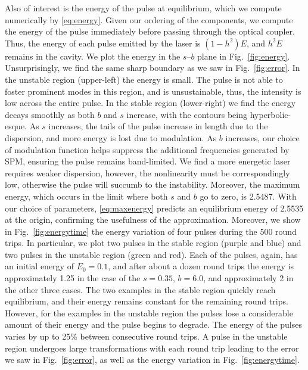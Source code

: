 \documentclass[9pt,twocolumn,twoside]{osajnl}
\begin{document}
Also of interest is the energy of the pulse at equilibrium, which we compute numerically by \eqref{eq:energy}. Given our ordering of the components, we compute the energy of the pulse immediately before passing through the optical coupler. Thus, the energy of each pulse emitted by the laser is $(1 - h^2) E$, and $h^2 E$ remains in the cavity. We plot the energy in the $s$--$b$ plane in Fig.~\ref{fig:energy}. Unsurprisingly, we find the same sharp boundary as we saw in Fig.~\ref{fig:error}. In the unstable region (upper-left) the energy is small. The pulse is not able to foster prominent modes in this region, and is unsustainable, thus, the intensity is low across the entire pulse. In the stable region (lower-right) we find the energy decays smoothly as both $b$ and $s$ increase, with the contours being hyperbolic-esque. As $s$ increases, the tails of the pulse increase in length due to the dispersion, and more energy is lost due to modulation. As $b$ increases, our choice of modulation function helps suppress the additional frequencies generated by SPM, ensuring the pulse remains band-limited. We find a more energetic laser requires weaker dispersion, however, the nonlinearity must be correspondingly low, otherwise the pulse will succumb to the instability. Moreover, the maximum energy, which occurs in the limit where both $s$ and $b$ go to zero, is 2.5487. With our choice of parameters, \eqref{eq:maxenergy} predicts an equilibrium energy of 2.5535 at the origin, confirming the usefulness of the approximation. Moreover, we show in Fig.~\ref{fig:energytime} the energy variation of four pulses during the 500 round trips. In particular, we plot two pulses in the stable region (purple and blue) and two pulses in the unstable region (green and red). Each of the pulses, again, has an initial energy of $E_0 = 0.1$, and after about a dozen round trips the energy is approximately 1.25 in the case of the $s = 0.35$, $b = 6.0$, and approximately 2 in the other three cases. The two examples in the stable region quickly reach equilibrium, and their energy remains constant for the remaining round trips. However, for the examples in the unstable region the pulses lose a considerable amount of their energy and the pulse begins to degrade. The energy of the pulses varies by up to 25\% between consecutive round trips. A pulse in the unstable region undergoes large transformations with each round trip leading to the error we saw in Fig.~\ref{fig:error}, as well as the energy variation in Fig.~\ref{fig:energytime}.
\end{document}
